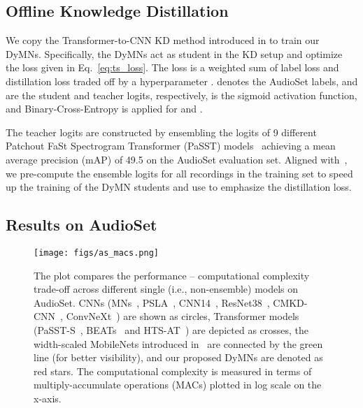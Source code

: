 \documentclass[lettersize,journal]{IEEEtran}
\begin{document}
\subsection{Offline Knowledge Distillation}
\label{subsec:offline_kd}

We copy the Transformer-to-CNN KD method introduced in \cite{Schmid22Efficient} to train our DyMNs. Specifically, the DyMNs act as student in the KD setup and optimize the loss given in Eq.~\ref{eq:ts_loss}. The loss is a weighted sum of label loss  and distillation loss  traded off by a hyperparameter .  denotes the AudioSet labels,  and  are the student and teacher logits, respectively,  is the sigmoid activation function, and Binary-Cross-Entropy is applied for  and . 



The teacher logits  are constructed by ensembling the logits of 9 different Patchout FaSt Spectrogram Transformer (PaSST) models~\cite{Koutini21Passt} achieving a mean average precision (mAP) of 49.5 on the AudioSet evaluation set. Aligned with~\cite{Schmid22Efficient}, we pre-compute the ensemble logits for all recordings in the training set to speed up the training of the DyMN students and use  to emphasize the distillation loss. 

\subsection{Results on AudioSet}
\label{subsec:results_audioset}

\begin{figure}[t]
\centering
{\texttt{[image: figs/as\_macs.png]}}
\caption{The plot compares the performance -- computational complexity trade-off across different single (i.e., non-ensemble) models on AudioSet. CNNs (MNs~\cite{Schmid22Efficient}, PSLA~\cite{Gong21PSLA}, CNN14~\cite{Kong20PANNs}, ResNet38~\cite{Kong20PANNs}, CMKD-CNN~\cite{Gong22CMKD}, ConvNeXt~\cite{pellegrini2023adapting}) are shown as circles, Transformer models (PaSST-S~\cite{Koutini21Passt}, BEATs~\cite{chen2022beats} and HTS-AT~\cite{Chen22HTS-AT}) are depicted as crosses, the width-scaled MobileNets introduced in~\cite{Schmid22Efficient} are connected by the green line (for better visibility), and our proposed DyMNs are denoted as red stars. The computational complexity is measured in terms of multiply-accumulate operations (MACs) plotted in log scale on the x-axis.}\label{fig:computational_comp}\end{figure}
\end{document}
